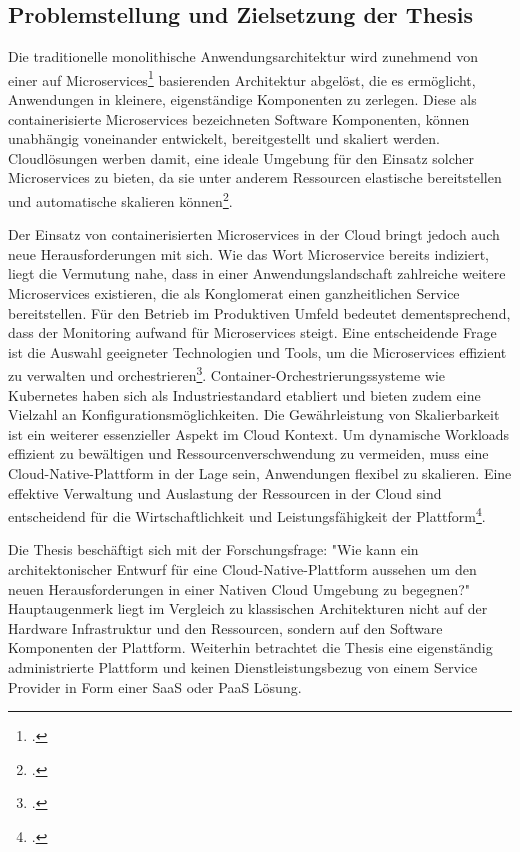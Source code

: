 \subsection{Problemstellung und Zielsetzung der Thesis}
Die traditionelle monolithische Anwendungsarchitektur wird zunehmend von einer auf Microservices\footcite[Vgl.][S.4]{wolff2018microservices} basierenden Architektur abgelöst, die es ermöglicht, Anwendungen in kleinere, eigenständige Komponenten zu zerlegen. Diese als containerisierte Microservices bezeichneten Software Komponenten, können unabhängig voneinander entwickelt, bereitgestellt und skaliert werden. Cloudlösungen werben damit, eine ideale Umgebung für den Einsatz solcher Microservices zu bieten, da sie unter anderem Ressourcen elastische bereitstellen und automatische skalieren können\footcite[Vgl.][S.8-19]{henneberger2016cloud}.

Der Einsatz von containerisierten Microservices in der Cloud bringt jedoch auch neue Herausforderungen mit sich. Wie das Wort Microservice bereits indiziert, liegt die Vermutung nahe, dass in einer Anwendungslandschaft zahlreiche weitere Microservices existieren, die als Konglomerat einen ganzheitlichen Service bereitstellen. Für den Betrieb im Produktiven Umfeld bedeutet dementsprechend, dass der Monitoring aufwand für Microservices steigt. Eine entscheidende Frage ist die Auswahl geeigneter Technologien und Tools, um die Microservices effizient zu verwalten und orchestrieren\footcite[Vgl.][S.12-16]{wolff2018microservices}.
Container-Orchestrierungssysteme wie Kubernetes haben sich als Industriestandard etabliert und bieten zudem eine Vielzahl an Konfigurationsmöglichkeiten. Die Gewährleistung von Skalierbarkeit ist ein weiterer essenzieller Aspekt im Cloud Kontext. Um dynamische Workloads effizient zu bewältigen und Ressourcenverschwendung zu vermeiden, muss eine Cloud-Native-Plattform in der Lage sein, Anwendungen flexibel zu skalieren. Eine effektive Verwaltung und Auslastung der Ressourcen in der Cloud sind entscheidend für die Wirtschaftlichkeit und Leistungsfähigkeit der Plattform\footcite[Vgl.][o.S.]{k8s2022}.

Die Thesis beschäftigt sich mit der Forschungsfrage: "Wie kann ein architektonischer Entwurf für eine Cloud-Native-Plattform aussehen um den neuen Herausforderungen in einer Nativen Cloud Umgebung zu begegnen?" Hauptaugenmerk liegt im Vergleich zu klassischen Architekturen nicht auf der Hardware Infrastruktur und den Ressourcen, sondern auf den Software Komponenten der Plattform. Weiterhin betrachtet die Thesis eine eigenständig administrierte Plattform und keinen Dienstleistungsbezug von einem Service Provider in Form einer \ac{SaaS} oder \ac{PaaS} Lösung.

